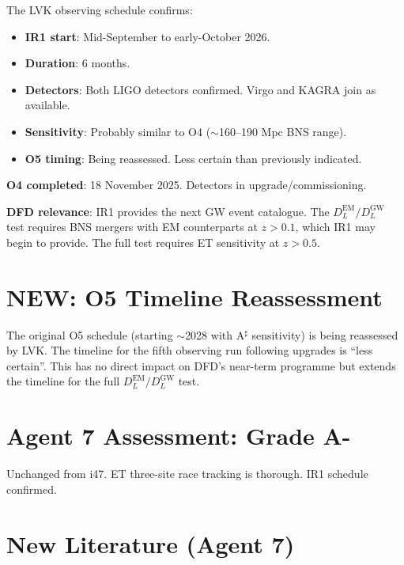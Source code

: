 \documentclass[11pt,a4paper]{article}
\newcommand{\NEW}{\textcolor{dfdblue}{\textbf{NEW}}}
\begin{document}
\begin{tcolorbox}[colback=green!5!white, colframe=green!60!black,
  title={LVK IR1: Confirmed September--October 2026 Start}]

The LVK observing schedule confirms:
\begin{itemize}
\item \textbf{IR1 start}: Mid-September to early-October 2026.
\item \textbf{Duration}: 6 months.
\item \textbf{Detectors}: Both LIGO detectors confirmed. Virgo and KAGRA join as available.
\item \textbf{Sensitivity}: Probably similar to O4 ($\sim$160--190 Mpc BNS range).
\item \textbf{O5 timing}: Being reassessed. Less certain than previously indicated.
\end{itemize}

\textbf{O4 completed}: 18 November 2025. Detectors in upgrade/commissioning.

\textbf{DFD relevance}: IR1 provides the next GW event catalogue. The $D_L^{\text{EM}}/D_L^{\text{GW}}$ test requires BNS mergers with EM counterparts at $z > 0.1$, which IR1 may begin to provide. The full test requires ET sensitivity at $z > 0.5$.
\end{tcolorbox}

\section{\NEW: O5 Timeline Reassessment}

The original O5 schedule (starting $\sim$2028 with A$^\sharp$ sensitivity) is being reassessed by LVK. The timeline for the fifth observing run following upgrades is ``less certain''. This has no direct impact on DFD's near-term programme but extends the timeline for the full $D_L^{\text{EM}}/D_L^{\text{GW}}$ test.

\section{Agent 7 Assessment: Grade A-}

Unchanged from i47. ET three-site race tracking is thorough. IR1 schedule confirmed.

\section{New Literature (Agent 7)}
\end{document}
